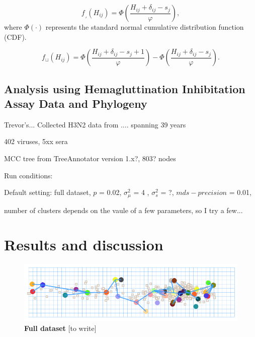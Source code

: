 \documentclass[11pt,oneside,letterpaper]{article}
\newcommand{\se}{s}									%
\newcommand{\threshold}{f_{\textstyle \lrcorner}}	%
\newcommand{\interval}{f_{\sqcup}}					%
\newcommand{\mdssd}{\varphi}						%
\begin{document}
\begin{equation} 
	\threshold(H_{ij}) = \Phi \left( \frac{ H_{ij} + \delta_{ij} - \se_j }{ \mdssd } \right),
\end{equation}
where $\Phi(\cdot)$ represents the standard normal cumulative distribution function (CDF).




\begin{equation} 
	\interval(H_{ij}) = \Phi \left( \frac{ H_{ij} + \delta_{ij} - \se_j + 1 }{ \mdssd } \right) - \Phi \left( \frac{ H_{ij} + \delta_{ij} - \se_j }{\mdssd} \right).
\end{equation}


\subsection*{Analysis using Hemagluttination Inhibitation Assay Data and Phylogeny}

Trevor's...
Collected H3N2 data from ....
spanning 39 years


402 viruses, 
5xx sera


MCC tree from TreeAnnotator version 1.x?, 803? nodes



Run conditions:

Default setting: full dataset, $p$ = 0.02, $\sigma^2_\mu$ = 4 ,   $\sigma^2_s$ = ?, $mds-precision$ = 0.01, 

number of clusters depends on the vaule of a few parameters, so I try a few...

\newpage

\section*{Results and discussion}





\begin{figure}[h]
	\centering		
	\includegraphics[width=1\textwidth]{figures/fullData-MCC-Euclid-50M}
	\caption{\textbf{Full dataset} 
[to write]
	} 
	\label{MyLabel} 
\end{figure}
\end{document}

